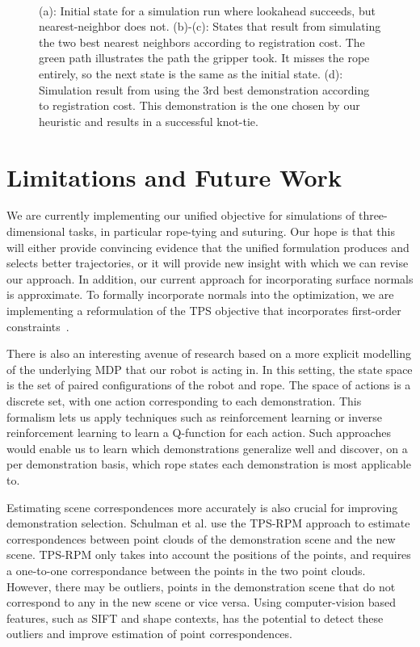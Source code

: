 \documentclass{article}
\begin{document}
\begin{figure}
\begin{subfigure}[b]{.24\textwidth}
\caption{}
\end{subfigure}\\
\caption{(a): Initial state for a simulation run where lookahead succeeds, but nearest-neighbor does not. (b)-(c): States that result from simulating the two best nearest neighbors according to registration cost. The green path illustrates the path the gripper took. It misses the rope entirely, so the next state is the same as the initial state. (d): Simulation result from using the 3rd best demonstration according to registration cost. This demonstration is the one chosen by our heuristic and results in a successful knot-tie.}
\label{fig:lookahead_results}
\end{figure}

\section{Limitations and Future Work}

We are currently implementing our unified objective for simulations of three-dimensional tasks, in particular rope-tying and suturing. Our hope is that this will either provide convincing evidence that the unified formulation produces and selects better trajectories, or it will provide new insight with which we can revise our approach. In addition, our current approach for incorporating surface normals is approximate. To formally incorporate normals into the optimization, we are implementing a reformulation of the TPS objective that incorporates first-order constraints~\cite{BooksteinGreen}.

There is also an interesting avenue of research based on a more explicit modelling of the underlying MDP that our robot is acting in. In this setting, the state space is the set of paired configurations of the robot and rope. The space of actions is a discrete set, with one action corresponding to each demonstration. This formalism lets us apply techniques such as reinforcement learning or inverse reinforcement learning to learn a Q-function for each action. Such approaches would enable us to learn which demonstrations generalize well and discover, on a per demonstration basis, which rope states each demonstration is most applicable to.

Estimating scene correspondences more accurately is also crucial for improving demonstration selection. Schulman et al. use the TPS-RPM approach to estimate correspondences between point clouds of the demonstration scene and the new scene. TPS-RPM only takes into account the positions of the points, and requires a one-to-one correspondance between the points in the two point clouds. However, there may be outliers, points in the demonstration scene that do not correspond to any in the new scene or vice versa. Using computer-vision based features, such as SIFT and shape contexts, has the potential to detect these outliers and improve estimation of point correspondences.
\end{document}

